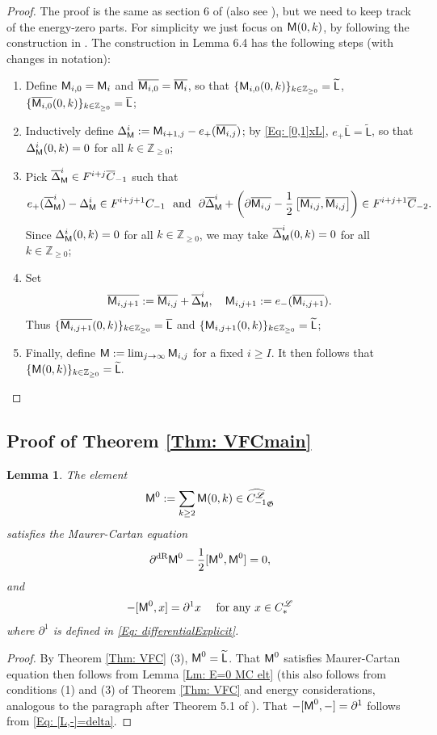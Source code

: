 \documentclass[10pt]{amsart}
\numberwithin{equation}{section}
\theoremstyle{plain}
\newtheorem{lemma}[theorem]{Lemma}
\theoremstyle{definition}
\theoremstyle{remark}
\numberwithin{equation}{section}
\newcommand{\Z}{\mathbb{Z}}
\newcommand{\wh}[1]{\widehat{#1}}
\newcommand{\wt}[1]{\widetilde{#1}}
\newcommand{\ol}[1]{\overline{#1}}
\newcommand{\dR}{\textup{dR}}
\newcommand{\CFr}{C_*^\mathscr{L}}
\newcommand{\Cfr}[1]{C_{#1}^\mathscr{L}}
\newcommand{\MM}{\textup{\textsf{M}}}
\newcommand{\LL}{\textsf{L}}
\begin{document}
{\begin{proof}
	The proof is the same as section 6 of \cite{Irie2} (also see \cite{IrieErratum}), but we need to keep track of the energy-zero parts. For simplicity we just focus on $\MM(0,k)$, by following the construction in \cite{Irie2}. 
	The construction in \cite{Irie2} Lemma 6.4 has the following steps (with changes in notation):
	\begin{enumerate}
		\item Define $\MM_{i,0}=\MM_i$ and $\ol{\MM_{i,0}}=\ol{\MM_i}$, so that $\{\MM_{i,0}(0,k)\}_{k\in\Z_{\geq 0}}= \wt{\LL}$, $\{\ol{\MM_{i,0}}(0,k)\}_{k\in\Z_{\geq 0}}= \ol{\LL}$;
		\item Inductively define $\Delta^i_\MM:= \MM_{i+1,j}-e_+(\ol{\MM_{i,j}})$;  by \eqref{Eq: [0,1]xL},  $e_+\ol{\LL} = \wt{\LL}$, so that $\Delta^i_\MM(0,k)=0$ for all $k\in \Z_{\geq 0}$;
		\item Pick $\ol{\Delta}_\MM^i\in F^{i+j} \ol{C}_{-1}$ such that \[e_+(\ol{\Delta}_\MM^i)-\Delta^i_\MM\in F^{i+j+1}C_{-1} \,\, \textup{ and } \,\, \partial \ol{\Delta}_\MM^i + \left(\partial \ol{\MM_{i,j}} - \frac{1}{2} \left[\ol{\MM_{i,j}},\ol{\MM_{i,j}}\right]\right) \in F^{i+j+1}\ol{C}_{-2}.\] Since $\Delta^i_\MM(0,k)=0$ for all $k\in \Z_{\geq 0}$, we may take $\ol{\Delta}_\MM^i(0,k)=0$ for all $k\in\Z_{\geq 0}$;
		\item Set \[ \ol{\MM_{i,j+1}}:= \ol{\MM_{i,j}}+\ol{\Delta}_\MM^i,\quad \MM_{i,j+1}:= e_-(\ol{\MM_{i,j+1}}). \]Thus $\{\ol{\MM_{i,j+1}}(0,k)\}_{k\in\Z_{\geq 0}} = \ol{\LL}$ and $\{\MM_{i,j+1}(0,k)\}_{k\in\Z_{\geq 0}} = \wt{\LL}$;
		\item Finally, define $\MM:= \lim_{j\to\infty} \MM_{i,j}$  for a fixed $i\geq I$. It then follows that $\{\MM(0,k)\}_{k\in \Z_{\geq 0}} = \wt{\LL}.$ 
	\end{enumerate}
\end{proof}


\subsection{Proof of Theorem \ref{Thm: VFCmain}} 


\begin{lemma}
	The element \[\MM^0:=\sum_{k\geq 2} \MM(0,k) \in \wh{\Cfr{-1}}_\mathfrak{G}\] satisfies the Maurer-Cartan equation \[ \partial^\dR \MM^0 - \frac{1}{2}[\MM^0,\MM^0] = 0, \] and \[ -[\MM^0, x]=\partial^1 x\quad \textup{ for any }x\in \CFr\] 
	where $\partial^1$ is defined in \eqref{Eq: differentialExplicit}.
\end{lemma}
\begin{proof}
	By Theorem \ref{Thm: VFC} (3), $\MM^0 = \wt{\LL}$. 
	That $\MM^0$ satisfies Maurer-Cartan equation then follows from Lemma \ref{Lm: E=0 MC elt} (this also follows from conditions (1) and (3) of Theorem \ref{Thm: VFC} and energy considerations, analogous to the paragraph after Theorem 5.1 of \cite{Irie2}). 
	That $-[\MM^0, -]= \partial^1$ follows from	\eqref{Eq: [L,-]=delta}.
\end{proof}

}
\end{document}
